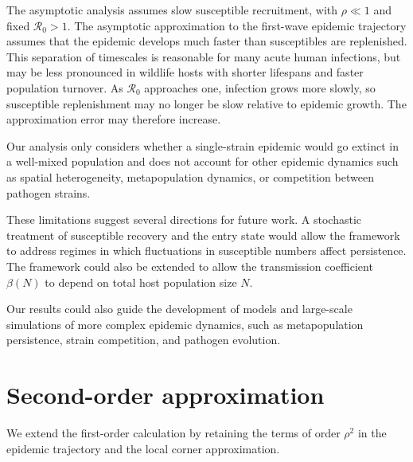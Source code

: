 \documentclass[11pt]{article}
\newcommand{\Rzero}{\mathcal R_0}
\newcommand{\rhoeps}{\rho}
\begin{document}
The asymptotic analysis assumes slow susceptible recruitment, with \(\rhoeps\ll1\) and fixed \(\Rzero>1\). The asymptotic approximation to the first-wave epidemic trajectory assumes that the epidemic develops much faster than susceptibles are replenished. This separation of timescales is reasonable for many acute human infections, but may be less pronounced in wildlife hosts with shorter lifespans and faster population turnover. As \(\Rzero\) approaches one, infection grows more slowly, so susceptible replenishment may no longer be slow relative to epidemic growth. The approximation error may therefore increase.

Our analysis only considers whether a single-strain epidemic would go extinct in a well-mixed population and does not account for other epidemic dynamics such as spatial heterogeneity, metapopulation dynamics, or competition between pathogen strains.

These limitations suggest several directions for future work. A stochastic treatment of susceptible recovery and the entry state would allow the framework to address regimes in which fluctuations in susceptible numbers affect persistence. The framework could also be extended to allow the transmission coefficient \(\beta(N)\) to depend on total host population size \(N\).

Our results could also guide the development of models and large-scale simulations of more complex epidemic dynamics, such as metapopulation persistence, strain competition, and pathogen evolution.

\appendix
\section{Second-order approximation}
\label{app:second-order}
We extend the first-order calculation by retaining the terms of order \(\rhoeps^2\) in the epidemic trajectory and the local corner approximation.
\end{document}
